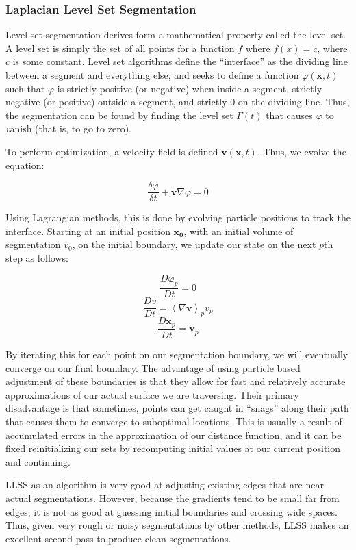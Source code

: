 \documentclass{article}
\begin{document}
\subsubsection*{Laplacian Level Set Segmentation}
Level set segmentation derives form a mathematical property called the level set. A level set is simply the set of all points for a function $f$ where $f(x) = c$, where $c$ is some constant. Level set algorithms define the ``interface'' as the dividing line between a segment and everything else, and seeks to define a function $\varphi(\mathbf{x},t)$ such that $\varphi$ is strictly positive (or negative) when inside a segment, strictly negative (or positive) outside a segment, and strictly $0$ on the dividing line. Thus, the segmentation can be found by finding the level set $\Gamma(t)$ that causes $\varphi$ to {\emph vanish} (that is, to go to zero).

To perform optimization, a velocity field is defined $\mathbf{v}(\mathbf{x},t)$. Thus, we evolve the equation\cite{osher}:

\[\frac{\delta\varphi}{\delta t} + \mathbf{v} \nabla\varphi = 0 \]

Using Lagrangian methods, this is done by evolving particle positions to track the interface. Starting at an initial position $\mathbf{x_0}$, with an initial volume of segmentation $v_0$, on the initial boundary, we update our state on the next $p$th step as follows\cite{hieber}:

\[\frac{D\varphi_p}{Dt} = 0 \]
\[\frac{Dv}{Dt} = \left< \nabla\mathbf{v}\right>_p v_p \]
\[\frac{D\mathbf{x}_p}{Dt} = \mathbf{v}_p \]

By iterating this for each point on our segmentation boundary, we will eventually converge on our final boundary. The advantage of using particle based adjustment of these boundaries is that they allow for fast and relatively accurate approximations of our actual surface we are traversing. Their primary disadvantage is that sometimes, points can get caught in ``snags'' along their path that causes them to converge to suboptimal locations. This is usually a result of accumulated errors in the approximation of our distance function, and it can be fixed reinitializing our sets by recomputing initial values at our current position and continuing\cite{hieber}.

LLSS as an algorithm is very good at adjusting existing edges that are near actual segmentations. However, because the gradients tend to be small far from edges, it is not as good at guessing initial boundaries and crossing wide spaces\cite{osher}. Thus, given very rough or noisy segmentations by other methods, LLSS makes an excellent second pass to produce clean segmentations.
\end{document}
